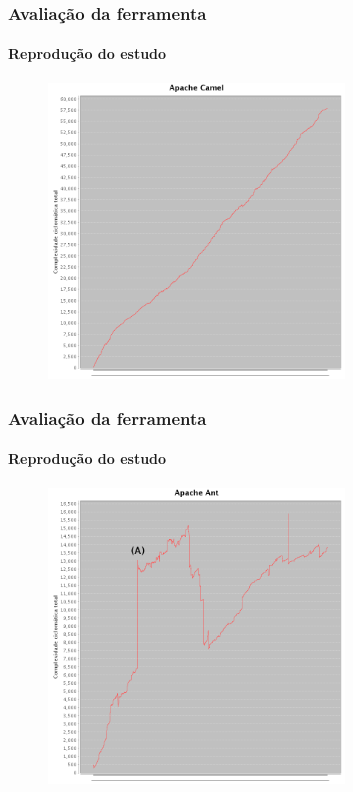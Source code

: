 \documentclass[brazil]{beamer}
\begin{document}
	\begin{frame}
		\frametitle{Avaliação da ferramenta}
		\framesubtitle{Reprodução do estudo}
		\begin{figure}[ht]
		\centering
		\includegraphics[width=0.7\textwidth]{img/camel.png}
		\end{figure}
	\end{frame}


	\begin{frame}
		\frametitle{Avaliação da ferramenta}
		\framesubtitle{Reprodução do estudo}
		\begin{figure}[ht]
		\centering
		\includegraphics[width=0.7\textwidth]{img/ant.png}
		\end{figure}
	\end{frame}
\end{document}
